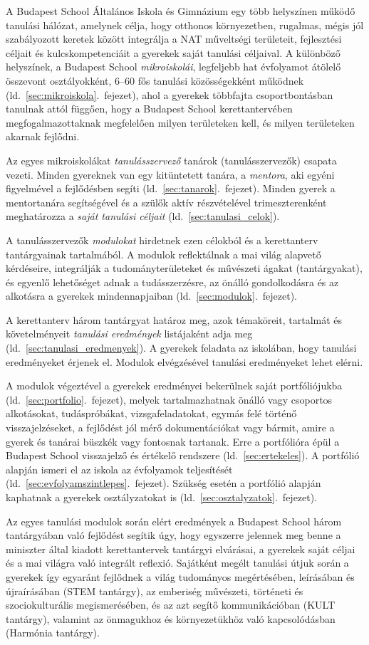 A Budapest School Általános Iskola és Gimnázium egy több helyszínen működő tanulási hálózat, amelynek célja, hogy otthonos környezetben, rugalmas, mégis jól szabályozott keretek között integrálja a NAT műveltségi területeit, fejlesztési céljait és kulcskompetenciáit a gyerekek saját tanulási céljaival. A különböző helyszínek, a Budapest School \emph{mikroiskolái}, legfeljebb hat évfolyamot átölelő összevont osztályokként, 6--60 fős tanulási közösségekként működnek (ld.~\ref{sec:mikroiskola}.~fejezet), ahol a gyerekek többfajta csoportbontásban tanulnak attól függően, hogy a Budapest School kerettantervében megfogalmazottaknak megfelelően milyen területeken kell, és milyen területeken akarnak fejlődni.

Az egyes mikroiskolákat \emph{tanulásszervező} tanárok (tanulásszervezők) csapata vezeti. Minden gyereknek van egy kitüntetett tanára, a \emph{mentora}, aki egyéni figyelmével a fejlődésben segíti (ld.~\ref{sec:tanarok}.~fejezet). Minden gyerek a mentortanára segítségével és a szülők aktív részvételével trimeszterenként meghatározza a \emph{saját tanulási céljait}
(ld.~\ref{sec:tanulasi_celok}).

A tanulásszervezők \emph{modulokat} hirdetnek ezen célokból és a kerettanterv tantárgyainak tartalmából. A modulok reflektálnak a mai világ alapvető kérdéseire, integrálják	a tudományterületeket és művészeti ágakat (tantárgyakat), és egyenlő lehetőséget adnak a tudásszerzésre, az önálló gondolkodásra és az alkotásra a gyerekek mindennapjaiban 
(ld.~\ref{sec:modulok}.~fejezet).

A kerettanterv három tantárgyat határoz meg, azok témaköreit, tartalmát és követelményeit \emph{tanulási eredmények} listájaként adja meg (ld.~\ref{sec:tanulasi_eredmenyek}). A gyerekek feladata az iskolában, hogy tanulási eredményeket érjenek el. Modulok elvégzésével tanulási eredményeket lehet elérni.

A modulok végeztével a gyerekek eredményei bekerülnek saját portfóliójukba (ld.~\ref{sec:portfolio}.~fejezet), melyek tartalmazhatnak önálló vagy csoportos alkotásokat, tudáspróbákat, vizsgafeladatokat, egymás felé történő visszajelzéseket, a fejlődést jól mérő dokumentációkat vagy bármit, amire a gyerek és tanárai büszkék vagy fontosnak tartanak. Erre a portfólióra épül a Budapest School visszajelző és értékelő rendszere (ld.~\ref{sec:ertekeles}). A portfólió alapján ismeri el az iskola az évfolyamok teljesítését (ld.~\ref{sec:evfolyamszintlepes}.~fejezet). Szükség esetén a portfólió alapján kaphatnak a gyerekek osztályzatokat is (ld.~\ref{sec:osztalyzatok}.~fejezet).

Az egyes tanulási modulok során elért eredmények a Budapest School három tantárgyában való fejlődést segítik úgy, hogy egyszerre jelennek meg benne a miniszter által kiadott kerettantervek tantárgyi elvárásai, a gyerekek saját céljai és a mai világra való integrált reflexió. Sajátként megélt tanulási útjuk során a gyerekek így egyaránt fejlődnek a világ tudományos megértésében, leírásában és újraírásában (STEM tantárgy), az emberiség művészeti, történeti és szociokulturális megismerésében, és az azt segítő kommunikáció\-ban (KULT tantárgy), valamint az önmagukhoz és környezetükhöz való kapcsolódásban (Harmónia tantárgy).